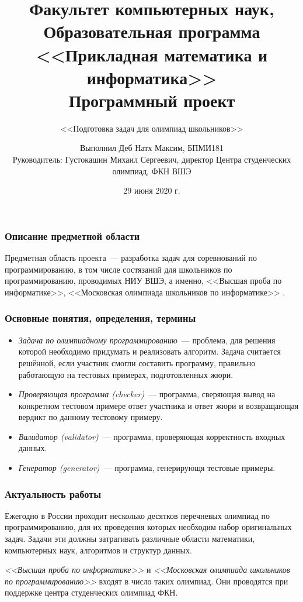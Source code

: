 \documentclass{beamer}
\title[Заголовок]{Факультет компьютерных наук, 
Образовательная программа <<Прикладная математика и информатика>>\\
Программный проект
}
\subtitle{<<Подготовка задач для олимпиад школьников>>}
\author[Деб Натх М., БПМИ181]{Выполнил Деб Натх Максим, БПМИ181\\{\small Руководитель:
Густокашин Михаил Сергеевич, директор Центра студенческих олимпиад, ФКН
ВШЭ }}
\institute[\tiny{<<Подготовка задач для олимпиад>>}]{}
\date{29 июня 2020 г.}
\begin{document}

\frame[plain]{\titlepage}    %






\begin{frame}
\frametitle{Описание предметной области}
Предметная область проекта~--- разработка задач для соревнований по программированию, в том числе состязаний для школьников по программированию, проводимых НИУ ВШЭ, а именно, <<Высшая проба по информатике>>, <<Московская олимпиада школьников по информатике>> .

\end{frame}








\begin{frame}
\frametitle{Основные понятия, определения, термины}
\begin{itemize}
 \item<1-> \emph{Задача по олимпиадному программированию}~--- проблема, для решения которой необходимо придумать и реализовать алгоритм. Задача считается решённой, если участник смогли составить программу, правильно работающую на тестовых примерах, подготовленных жюри.
 \item<2-> \emph{Проверяющая программа (checker)}~--- программа, сверяющая вывод на конкретном тестовом примере ответ участника и ответ жюри и возвращающая вердикт по данному тестовому примеру.
 \item<3-> \emph{Валидатор (validator)}~--- программа, проверяющая корректность входных данных.
 \item<4-> \emph{Генератор (generator)}~--- программа, генерирующя тестовые примеры.
\end{itemize}
\end{frame}








\begin{frame}
\frametitle{Актуальность работы}
Ежегодно в России проходит несколько десятков перечневых олимпиад по программированию, для их проведения которых необходим набор оригинальных задач. Задачи эти должны затрагивать различные области математики, компьютерных наук, алгоритмов и структур данных. 
\bigskip

\emph{ <<Высшая проба по информатике>> } и \emph{ <<Московская олимпиада школьников по программированию>> } входят в число таких олимпиад. Они проводятся при поддержке центра студенческих олимпиад ФКН.
\end{frame}
\end{document}
